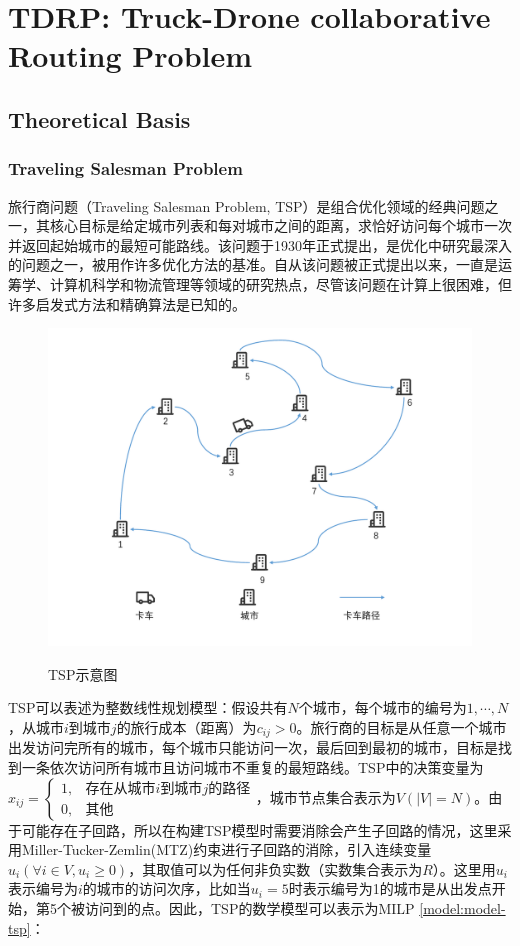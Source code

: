\part{TDRP: Truck-Drone collaborative Routing Problem}

\chapter{Theoretical Basis}

\section{Traveling Salesman Problem}
旅行商问题（Traveling Salesman Problem, TSP）是组合优化领域的经典问题之一，其核心目标是给定城市列表和每对城市之间的距离，求恰好访问每个城市一次并返回起始城市的最短可能路线。该问题于1930年正式提出，是优化中研究最深入的问题之一，被用作许多优化方法的基准。自从该问题被正式提出以来，一直是运筹学、计算机科学和物流管理等领域的研究热点，尽管该问题在计算上很困难，但许多启发式方法和精确算法是已知的\cite{2009A, 2012Models}。

\begin{figure}[!htb]
    \centering
    \includegraphics[width=\linewidth]{images/TSP.pdf}\\
    \caption{TSP示意图}
\end{figure}

TSP可以表述为整数线性规划模型\cite{papadimitriou1998combinatorial}：假设共有$N$个城市，每个城市的编号为$1,\cdots,N$，从城市$i$到城市$j$的旅行成本（距离）为$c_{ij}>0$。旅行商的目标是从任意一个城市出发访问完所有的城市，每个城市只能访问一次，最后回到最初的城市，目标是找到一条依次访问所有城市且访问城市不重复的最短路线。TSP中的决策变量为$x_{ij}=\begin{cases}1, & \text{存在从城市$i$到城市$j$的路径}\\0, & \text{其他} \end{cases}$，城市节点集合表示为$V(|V| = N)$。由于可能存在子回路，所以在构建TSP模型时需要消除会产生子回路的情况，这里采用Miller-Tucker-Zemlin(MTZ)约束进行子回路的消除\cite{1960Integer}，引入连续变量$u_i(\forall i \in V, u_i \geq 0)$，其取值可以为任何非负实数（实数集合表示为$R$）。这里用$u_i$表示编号为$i$的城市的访问次序，比如当$u_i = 5$时表示编号为1的城市是从出发点开始，第5个被访问到的点。因此，TSP的数学模型可以表示为MILP \ref{model:model-tsp}：

